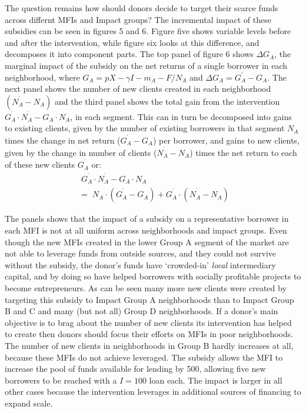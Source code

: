 \documentclass{article} %
\begin{document}
The question remains how should donors decide to target their scarce funds across differnt MFIs and Impact groups?   The incremental impact of these subsidies can be seen in figures 5 and 6.  Figure five shows variable levels before and after the intervention, while figure six looks at this difference, and decomposes it into component parts.  The top panel of figure 6 shows $\Delta G_{A} $, the marginal impact of the subsidy on the net returns of a single borrower in each neighborhood, where $G_{A} =pX-\gamma I-m_{A} -F/N_{A} $ and $\Delta G_{A} =G_{A}^{{'} } -G_{A} .$  The next panel shows the number of new clients created in each neighborhood $(N_{A}^{{}^{{'} } } -N_{A} )$ and the third panel shows the total gain from the intervention $G_{A}^{{}^{{'} } } \cdot N_{A}^{{}^{{'} } } -G_{A} \cdot N_{A} $, in each segment. This can in turn be decomposed into gains to existing clients, given by the number of existing borrowers in that segment $N_{A} $ times the change in net return ($G_{A}^{{}^{{'} } } -G_{A} $) per borrower, and gains to new clients, given by the change in number of clients ($N_{A}^{{}^{{'} } } -N_{A} $) times the net return to each of these new clients $G_{A}^{{}^{{'} } } $ or:
\[\begin{array}{l} {\phantom{.} \phantom{.} G_{A}^{{}^{{'} } } \cdot N_{A}^{{}^{{'} } } -G_{A} \cdot N_{A} } \\ {\phantom{.} =\phantom{.} N_{A} \cdot (G_{A}^{{}^{{'} } } -G_{A} )+G_{A}^{{}^{{'} } } \cdot (N_{A}^{{}^{{'} } } -N_{A} )} \end{array}\] 

The panels shows that the impact of a subsidy on a representative borrower in each MFI is not at all uniform across neighborhoods and impact groups. Even though the new MFIs created in the lower Group A segment of the market are not able to leverage funds from outside sources, and they could not survive without the subsidy, the donor's funds have `crowded-in' \textit{local} intermediary capital, and by doing so have helped borrowers with socially profitable projects to become entrepreneurs. As can be seen many more new clients were created by targeting this subsidy to Impact Group A neighborhoods than to Impact Group B and C and many (but not all) Group D neighborhoods. If a donor's main objective is to brag about the number of new clients its intervention has helped to create then donors should focus their efforts on MFIs in poor neighborhoods.  The number of new clients in neighborhoods in Group B hardly increases at all, because these MFIs do not achieve leveraged.  The subsidy allows the MFI to increase the pool of funds available for lending by 500, allowing five new borrowers to be reached with a $I=100$ loan each.  The impact is larger in all other cases because the intervention leverages in additional sources of financing to expand scale. 
\end{document}
